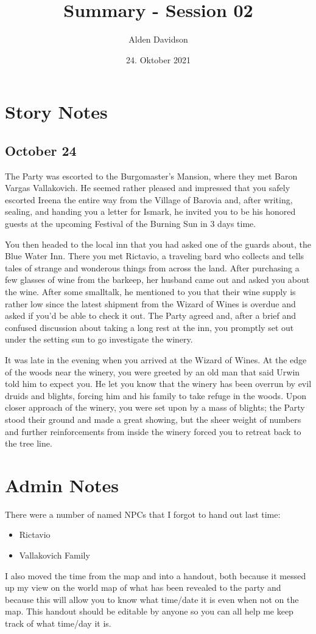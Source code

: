 \documentclass[a4paper,11pt]{article}
\title{Summary - Session 02}
\author{Alden Davidson}
\date{24. Oktober 2021}
\begin{document}
\maketitle

\section{Story Notes}
\subsection{October 24}
The Party was escorted to the Burgomaster's Mansion, where they met Baron Vargas Vallakovich. He seemed rather
pleased and impressed that you safely escorted Ireena the entire way from the Village of Barovia and, after 
writing, sealing, and handing you a letter for Ismark, he invited you to be his honored guests at the upcoming 
Festival of the Burning Sun in 3 days time.

You then headed to the local inn that you had asked one of the guards about, the Blue Water Inn. There you met
Rictavio, a traveling bard who collects and tells tales of strange and wonderous things from across the land. After
purchasing a few glasses of wine from the barkeep, her husband came out and asked you about the wine. After some
smalltalk, he mentioned to you that their wine supply is rather low since the latest shipment from the Wizard of 
Wines is overdue and asked if you'd be able to check it out. The Party agreed and, after a brief and confused
discussion about taking a long rest at the inn, you promptly set out under the setting sun to go investigate the
winery.

It was late in the evening when you arrived at the Wizard of Wines. At the edge of the woods near the winery, you
were greeted by an old man that said Urwin told him to expect you. He let you know that the winery has been overrun
by evil druids and blights, forcing him and his family to take refuge in the woods. Upon closer approach of the 
winery, you were set upon by a mass of blights; the Party stood their ground and made a great showing, but the sheer
weight of numbers and further reinforcements from inside the winery forced you to retreat back to the tree line.

\section{Admin Notes}
There were a number of named NPCs that I forgot to hand out last time:
\begin{itemize}
  \item Rictavio
  \item Vallakovich Family
\end{itemize}
I also moved the time from the map and into a handout, both because it messed up my view on the world map of what
has been revealed to the party and because this will allow you to know what time/date it is even when not on the
map. This handout should be editable by anyone so you can all help me keep track of what time/day it is.
\end{document}
